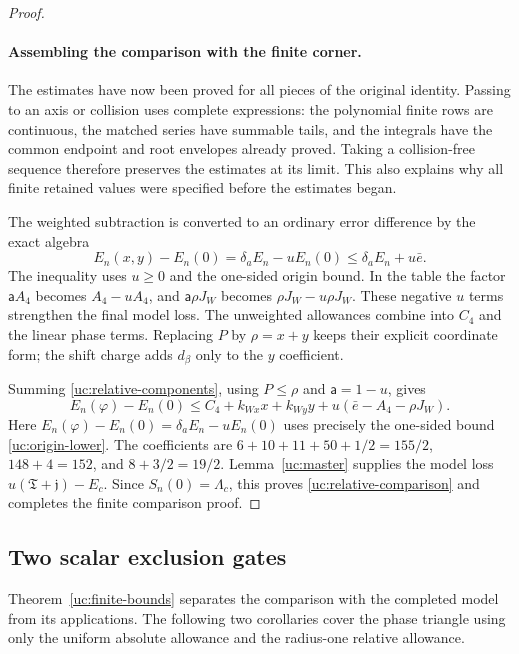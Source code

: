 \begin{proof}
\paragraph{Assembling the comparison with the finite corner.}
The estimates have now been proved for all pieces of the original
identity. Passing to an axis or collision uses complete expressions:
the polynomial finite rows are continuous, the matched series have
summable tails, and the integrals have the common endpoint and root
envelopes already proved. Taking a collision-free sequence therefore
preserves the estimates at its limit. This also explains why all
finite retained values were specified before the estimates began.

The weighted subtraction is converted to an ordinary error difference
by the exact algebra
\[
 E_n(x,y)-E_n(0)=\delta_aE_n-uE_n(0)\leq\delta_aE_n+u\bar e.
\]
The inequality uses $u\geq0$ and the one-sided origin bound. In the
table the factor $\mathsf{a}A_4$ becomes $A_4-uA_4$, and
$\mathsf{a}\rho J_W$ becomes $\rho J_W-u\rho J_W$.
These negative $u$ terms strengthen the final model loss. The
unweighted allowances combine into $C_4$ and the linear phase terms.
Replacing $P$ by $\rho=x+y$ keeps their explicit coordinate form;
the shift charge adds $d_\beta$ only to the $y$ coefficient.

Summing \eqref{uc:relative-components}, using $P\leq\rho$ and
$\mathsf a=1-u$, gives
\[
 E_n(\varphi)-E_n(0)\leq C_4+k_{Wx}x+k_{Wy}y
                       +u(\bar e-A_4-\rho J_W).
\]
Here $E_n(\varphi)-E_n(0)=\delta_aE_n-uE_n(0)$ uses precisely the
one-sided bound \eqref{uc:origin-lower}. The coefficients are
$6+10+11+50+1/2=155/2$, $148+4=152$, and $8+3/2=19/2$.
Lemma~\ref{uc:master} supplies the model loss
$u(\mathfrak T+\mathfrak j)-E_c$. Since $S_n(0)=\Lambda_c$,
this proves \eqref{uc:relative-comparison} and completes the finite comparison proof.
\end{proof}

\subsection{Two scalar exclusion gates}

Theorem~\ref{uc:finite-bounds} separates the comparison with the
completed model from its applications. The following two corollaries
cover the phase triangle using only the uniform absolute allowance and
the radius-one relative allowance.

